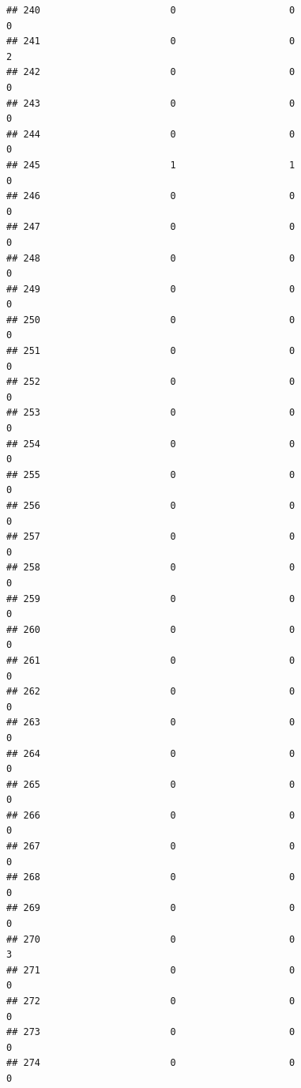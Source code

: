 \documentclass[
]{article}
\begin{document}
\begin{verbatim}
## 240                       0                    0                      0
## 241                       0                    0                      2
## 242                       0                    0                      0
## 243                       0                    0                      0
## 244                       0                    0                      0
## 245                       1                    1                      0
## 246                       0                    0                      0
## 247                       0                    0                      0
## 248                       0                    0                      0
## 249                       0                    0                      0
## 250                       0                    0                      0
## 251                       0                    0                      0
## 252                       0                    0                      0
## 253                       0                    0                      0
## 254                       0                    0                      0
## 255                       0                    0                      0
## 256                       0                    0                      0
## 257                       0                    0                      0
## 258                       0                    0                      0
## 259                       0                    0                      0
## 260                       0                    0                      0
## 261                       0                    0                      0
## 262                       0                    0                      0
## 263                       0                    0                      0
## 264                       0                    0                      0
## 265                       0                    0                      0
## 266                       0                    0                      0
## 267                       0                    0                      0
## 268                       0                    0                      0
## 269                       0                    0                      0
## 270                       0                    0                      3
## 271                       0                    0                      0
## 272                       0                    0                      0
## 273                       0                    0                      0
## 274                       0                    0                      0

\end{verbatim}
\end{document}
